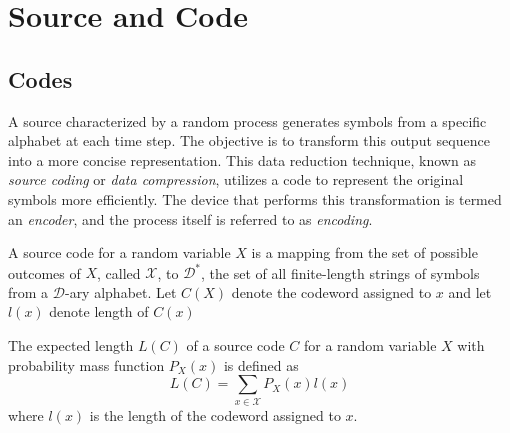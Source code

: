\section{Source and Code} \label{sec:source_and_codes}



\subsection{Codes}

A source characterized by a random process generates symbols from a specific alphabet at each time step. The objective is to transform this output sequence into a more concise representation. This data reduction technique, known as \emph{source coding} or \emph{data compression}, utilizes a code to represent the original symbols more efficiently. The device that performs this transformation is termed an \emph{encoder}, and the process itself is referred to as \emph{encoding}. \cite{han2002mathematics}

\begin{definition}\label{def:code}
    A source code for a random variable $X$ is a mapping from the set of possible outcomes of $X$, called $\mathcal{X}$, to $\mathcal{D}^*$, the set of all finite-length strings of symbols from a $\mathcal{D}$-ary alphabet. Let $C(X)$ denote the codeword assigned to $x$ and let $l(x)$ denote length of $C(x)$
\end{definition}

\begin{definition}\label{def:expected_length}
    The expected length $L(C)$ of a source code $C$ for a random variable $X$ with probability mass function $P_X(x)$ is defined as
    \begin{equation}
        L(C) = \sum_{x\in\mathcal{X}} P_X(x)l(x)
    \end{equation}
    where $l(x)$ is the length of the codeword assigned to $x$.
\end{definition}

